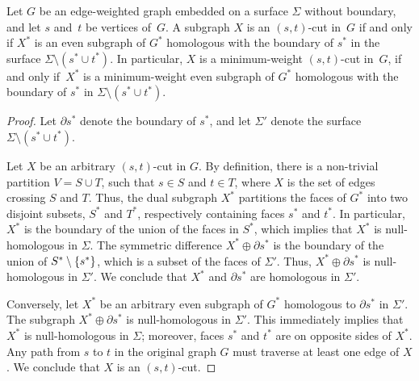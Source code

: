 \documentclass[letterpaper,review]{siamart190516}
\def\Cut{X}
\begin{document}
\begin{lemma}
\label{lem:cut-duality}
Let $G$ be an edge-weighted graph embedded on a surface $\Sigma$ without boundary, and let $s$ and~$t$ be vertices of~$G$.  A subgraph $\Cut$ is an $(s,t)$-cut in~$G$ if and only if $\Cut^*$ is an even subgraph of $G^*$ homologous with the boundary of $s^*$ in the surface $\Sigma\setminus(s^*\cup t^*)$.
In particular, $X$ is a minimum-weight $(s,t)$-cut in~$G$, if and only if~$\Cut^*$ is a minimum-weight even subgraph of $G^*$ homologous with the boundary of $s^*$ in $\Sigma\setminus(s^*\cup t^*)$.
\end{lemma}

\begin{proof}
Let $\partial s^*$ denote the boundary of $s^*$, and let $\Sigma'$ denote the surface $\Sigma\setminus {(s^*\cup t^*)}$.

Let $\Cut$ be an arbitrary $(s,t)$-cut in $G$.  By definition, there is a non-trivial partition $V = S\cup T$, such that $s\in S$ and $t\in T$, where $\Cut$ is the set of edges crossing $S$ and $T$.
Thus, the dual subgraph $\Cut^*$ partitions the faces of $G^*$ into two disjoint subsets, $S^*$ and $T^*$, respectively containing faces $s^*$ and $t^*$.  In particular, $\Cut^*$ is the boundary of the union of the faces in $S^*$, which implies that $\Cut^*$ is null-homologous in $\Sigma$.  The symmetric difference $\Cut^* \oplus \partial s^*$ is the boundary of the union of $S^* \setminus\{ s^* \}$, which is a subset of the faces of $\Sigma'$.  Thus, $\Cut^*\oplus \partial s^*$ is null-homologous in $\Sigma'$.  We conclude that $\Cut^*$ and  $\partial s^*$ are homologous in $\Sigma'$.

Conversely, let $\Cut^*$ be an arbitrary even subgraph of $G^*$ homologous to $\partial s^*$ in $\Sigma'$.  The subgraph $\Cut^*\oplus \partial s^*$ is null-homologous in $\Sigma'$.  This immediately implies that $X^*$ is null-homologous in $\Sigma$; moreover, faces $s^*$ and $t^*$ are on opposite sides of $X^*$.  Any path from $s$ to $t$ in the original graph $G$ must traverse at least one edge of $\Cut$.  We conclude that $\Cut$ is an $(s,t)$-cut.
\end{proof}


\end{document}
